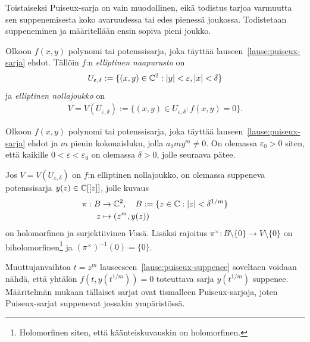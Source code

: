 Toistaiseksi Puiseux-sarja on vain muodollinen, eikä todistus tarjoa varmuutta sen suppenemisesta koko avaruudessa tai edes pienessä joukossa. Todistetaan suppeneminen ja määritellään ensin sopiva pieni joukko.
\begin{maaritelma}
    Olkoon $f(x,y)$ polynomi tai potenssisarja, joka täyttää lauseen~\ref{lause:puiseux-sarja} ehdot. Tällöin $f$:n \emph{elliptinen naapurusto} on 
    \begin{align*}
        U_{\varepsilon,\delta}:=\{(x,y)\in\mathbb{C}^2:|y|<\varepsilon,|x|<\delta\}
    \end{align*}
    ja \emph{elliptinen nollajoukko} on
    \begin{align*}
        V=V(U_{\varepsilon,\delta}):=\{(x,y)\in U_{\varepsilon,\delta}:f(x,y)=0\}.
    \end{align*}
\end{maaritelma}
\begin{lause}
    \label{lause:puiseux-suppenee}
    Olkoon $f(x,y)$ polynomi tai potenssisarja, joka täyttää lauseen~\ref{lause:puiseux-sarja} ehdot ja $m$ pienin kokonaisluku, jolla $a_0my^m\ne0$. On olemassa $\varepsilon_0>0$ siten, että kaikille $0<\varepsilon<\varepsilon_0$ on olemassa $\delta>0$, jolle seuraava pätee.

    Jos $V=V(U_{\varepsilon,\delta})$ on $f$:n elliptinen nollajoukko, on olemassa suppeneva potenssisarja $y(z)\in\mathbb{C}[[z]]$, jolle kuvaus 
    \begin{align*}
        \pi:B&\to\mathbb{C}^2,\quad B:=\{z\in\mathbb{C}:|z|<\delta^{1/m}\} \\
        z&\mapsto(z^m,y(z))
    \end{align*}
    on holomorfinen ja surjektiivinen $V$:ssä. Lisäksi rajoitus $\pi^\times:B\setminus\{0\}\to V\setminus\{0\}$ on biholomorfinen\footnote{Holomorfinen siten, että käänteiskuvauskin on holomorfinen.} ja $(\pi^\times)^{-1}(0)=\{0\}$.
\end{lause}
Muuttujanvaihtoa $t=z^m$ lauseeseen~\ref{lause:puiseux-suppenee} soveltaen voidaan nähdä, että yhtälön $f(t,y(t^{1/m}))=0$ toteuttava sarja $y(t^{1/m})$ suppenee. Määritelmän mukaan tällaiset sarjat ovat tismalleen Puiseux-sarjoja, joten Puiseux-sarjat suppenevat jossakin ympäristössä.


